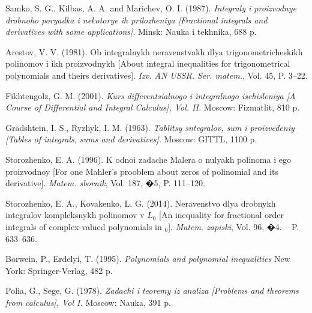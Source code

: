\documentclass[11pt, twoside]{article}
\begin{document}
{\footnotesize
\begin{thebibliography}{99}

{Samko, S. G., Kilbas, A. A. and Marichev, O. I. (1987). {\it Integraly i proizvodnye drobnoho poryadka i nekotorye 
ih prilozheniya [Fractional integrals and derivatives with some applications]}.}
Minsk: Nauka i tekhnika, 688 p.

Arestov, V. V. (1981). 
Ob integralnykh neravenstvakh dlya trigonometricheskikh polinomov i ikh proizvodnykh
[About integral inequalities for trigonometrical polynomials and theirs derivatives].
\textit{Izv. AN USSR. Ser. matem.}, Vol. 45, P. 3--22.

Fikhtengolz, G. M. (2001). \textit{Kurs differentsialnogo i integralnogo ischisleniya 
[A Course of Differential and Integral Calculus], Vol. II.}  Moscow: Fizmatlit,  810 p.

Gradshtein, I. S., Ryzhyk, I. M. (1963). 
\textit{Tablitsy sntegralov, sum i  proizvedeniy [Tables of integrals, sums and derivatives]}.
Moscow: GITTL, 1100 p.

Storozhenko, E. A. (1996). {K odnoi zadache Malera o nulyakh polinoma i ego proizvodnoy 
[For one Mahler's prooblem about zeros of polinomial and its derivative].}  
\textit{Matem. sbornik}, Vol. 187, �5, P. 111--120.

Storozhenko, E. A., Kovakenko, L. G. (2014).
Neravenstvo dlya drobnykh integralov kompleksnykh polinomov v $L_0$
[An inequality for fractional order integrals of complex-valued polynomials in $_0$].
\textit{Matem. zapiski}, Vol. 96, �4. -- P. 633--636.

Borwein, P., Erdelyi, T. (1995). \textit{Polynomials and polynomial inequalities} 
New York: Springer-Verlag, 482 p.

Polia, G., Sege, G. (1978). \textit{Zadachi i teoremy iz analiza [Problems and theorems from calculus], Vol I.}
Moscow: Nauka, 391 p.


\end{thebibliography}
}
\end{document}
